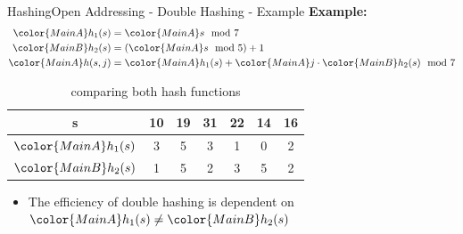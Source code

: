 
\begin{frame}{Hashing}{Open Addressing - Double Hashing - Example}
  \textbf{Example:}
  {\color{MainA}
  \begin{align*}
    {\color{MainA}h_1(s)} &= {\color{MainA}s \mod 7}\\
    {\color{MainB}h_2(s)}
      &= \left({\color{MainA}s} \mod 5\right) + 1\\
    {\color{MainA}h(s,j)}
      &= {\color{MainA}h_1(s)}
      + {\color{MainA}j} \cdot {\color{MainB}h_2(s)}
      \mod 7
  \end{align*}}
  \vspace{-1.0em}
  \begin{table}[!h]
    \caption{comparing both hash functions}
    \begin{tabular}{c|cccccc}
      {\color{MainA}s} & 10 & 19 & 31 & 22 & 14 & 16\\
      \midrule
      ${\color{MainA}h_1(s)}$ & 3 & 5 & 3 & 1 & 0 & 2\\
      ${\color{MainB}h_2(s)}$ & 1 & 5 & 2 & 3 & 5 & 2
    \end{tabular}
  \end{table}
  \begin{itemize}
    \item
      The efficiency of double hashing is dependent on
      \begin{math}
       {\color{MainA}h_1(s)} \neq {\color{MainB}h_2(s)}
      \end{math}
 \end{itemize}
\end{frame}


